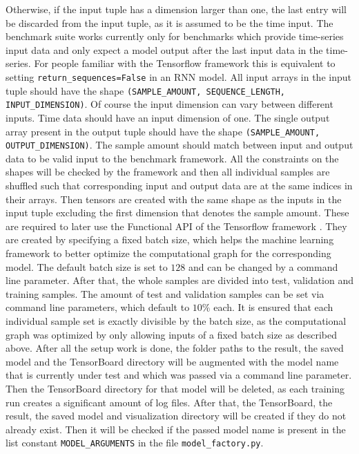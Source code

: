\documentclass[draft,final]{vutinfth} %
\begin{document}
    Otherwise, if the input tuple has a dimension larger than one, the last entry will be discarded from the input tuple, as it is assumed to be the time input.
    The benchmark suite works currently only for benchmarks which provide time-series input data and only expect a model output after the last input data in the time-series.
    For people familiar with the Tensorflow framework \cite{Tensorflow} this is equivalent to setting \texttt{return\_sequences=False} in an RNN model.
    All input arrays in the input tuple should have the shape \texttt{(SAMPLE\_AMOUNT, SEQUENCE\_LENGTH, INPUT\_DIMENSION)}.
    Of course the input dimension can vary between different inputs. Time data should have an input dimension of one. 
    The single output array present in the output tuple should have the shape \texttt{(SAMPLE\_AMOUNT, OUTPUT\_DIMENSION)}.
    The sample amount should match between input and output data to be valid input to the benchmark framework.
    All the constraints on the shapes will be checked by the framework and then all individual samples are shuffled such that corresponding input and output data are at the same indices in their arrays.
    Then tensors are created with the same shape as the inputs in the input tuple excluding the first dimension that denotes the sample amount.
    These are required to later use the Functional API of the Tensorflow framework \cite{Tensorflow}.
    They are created by specifying a fixed batch size, which helps the machine learning framework to better optimize the computational graph for the corresponding model.
    The default batch size is set to $128$ and can be changed by a command line parameter.
    After that, the whole samples are divided into test, validation and training samples. The amount of test and validation samples can be set via command line parameters, which default to $10\%$ each. 
    It is ensured that each individual sample set is exactly divisible by the batch size, as the computational graph was optimized by only allowing inputs of a fixed batch size as described above.
    After all the setup work is done, the folder paths to the result, the saved model and the TensorBoard directory will be augmented with the model name that is currently under test and which was passed via a command line parameter.
    Then the TensorBoard directory for that model will be deleted, as each training run creates a significant amount of log files.
    After that, the TensorBoard, the result, the saved model and visualization directory will be created if they do not already exist. 
    Then it will be checked if the passed model name is present in the list constant \texttt{MODEL\_ARGUMENTS} in the file \texttt{model\_factory.py}.
\end{document}
